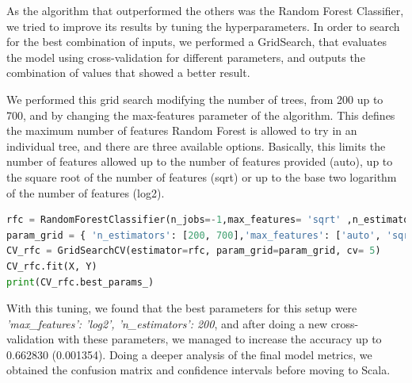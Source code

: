 As the algorithm that outperformed the others was the Random Forest Classifier, we tried to improve its results by tuning the hyperparameters. In order to search for the best combination of inputs, we performed a GridSearch, that evaluates the model using cross-validation for different parameters, and outputs the combination of values that showed a better result.

We performed this grid search modifying the number of trees, from 200 up to 700, and by changing the max-features parameter of the algorithm. This defines the maximum number of features Random Forest is allowed to try in an individual tree, and there are three available options. Basically, this limits the number of features allowed up to the number of features provided (auto), up to the square root of the number of features (sqrt) or up to the base two logarithm of the number of features (log2). \\

\begin{lstlisting}[language=Python, caption=Portion of the code we used for performing the parameters grid search.]
rfc = RandomForestClassifier(n_jobs=-1,max_features= 'sqrt' ,n_estimators=50, oob_score = True) 
param_grid = { 'n_estimators': [200, 700],'max_features': ['auto', 'sqrt', 'log2']}
CV_rfc = GridSearchCV(estimator=rfc, param_grid=param_grid, cv= 5)
CV_rfc.fit(X, Y)
print(CV_rfc.best_params_)
\end{lstlisting}

With this tuning, we found that the best parameters for this setup were \textit{'max\_features': 'log2', 'n\_estimators': 200}, and after doing a new cross-validation with these parameters, we managed to increase the accuracy up to 0.662830 (0.001354). Doing a deeper analysis of the final model metrics, we obtained the confusion matrix and confidence intervals before moving to Scala.

